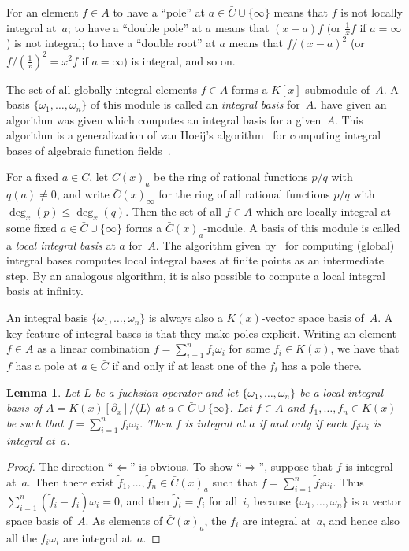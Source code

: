 \documentclass[final,1p,times,authoryear]{elsarticle}
\newtheorem{lemma}[theorem]{Lemma}
\def\<#1>{\langle#1\rangle}
\begin{document}
For an element $f\in A$ to have a ``pole'' at $a\in\bar C\cup\{\infty\}$ means
that $f$ is not locally integral at~$a$; to have a ``double pole'' at $a$ means
that $(x-a)f$ (or $\frac1xf$ if $a=\infty$) is not integral; to have a ``double
root'' at $a$ means that $f/(x-a)^2$ (or $f/(\frac1x)^2=x^2f$ if $a=\infty$) is integral,
and so on.

The set of all globally integral elements $f\in A$ forms a $K[x]$-submodule of~$A$.
A basis $\{\omega_1,\dots,\omega_n\}$ of this module is called an \emph{integral basis}
for~$A$. \cite{kauers15b} have given an algorithm was given which computes an integral basis
for a given~$A$. This algorithm is a generalization of van Hoeij's
algorithm~\citep{vanHoeij94} for computing integral bases of algebraic function
fields~\citep{trager84,Rybowicz:1991:ACI:120694.120715}.

For a fixed $a\in\bar C$, let $\bar C(x)_a$ be the ring of rational functions $p/q$
with $q(a)\neq0$, and write $\bar C(x)_\infty$ for the ring of all
rational functions $p/q$ with $\deg_x(p)\leq\deg_x(q)$.
Then the set of all $f\in A$ which are locally integral at some
fixed $a\in\bar C\cup\{\infty\}$ forms a $\bar C(x)_a$-module. A basis of this module is
called a \emph{local integral basis} at $a$ for~$A$. The algorithm given by~\cite{kauers15b}
for computing (global) integral bases computes local integral bases at finite
points as an intermediate step. By an analogous algorithm, it is also possible
to compute a local integral basis at infinity.

An integral basis $\{\omega_1,\dots,\omega_n\}$ is always also a $K(x)$-vector space
basis of~$A$. A key feature of integral bases is that they make poles explicit. Writing
an element $f\in A$ as a linear combination $f=\sum_{i=1}^n f_i\omega_i$ for some
$f_i\in K(x)$, we have that $f$ has a pole at $a\in\bar C$ if and only if at least one
of the $f_i$ has a pole there.

\begin{lemma}\label{lemma:1}
  Let $L$ be a fuchsian operator and let
  $\{\omega_1,\dots,\omega_n\}$ be a local integral basis of $A=K(x)[\partial_x]/\<L>$ at $a\in\bar C\cup\{\infty\}$.
  Let $f\in A$ and $f_1,\dots,f_n\in K(x)$ be such that $f=\sum_{i=1}^nf_i\omega_i$.
  Then $f$ is integral at $a$ if and only if each $f_i\omega_i$ is integral at~$a$.
\end{lemma}
\begin{proof}
  The direction ``$\Leftarrow$'' is obvious. To show ``$\Rightarrow$'', suppose
  that $f$ is integral at~$a$. Then there exist $\tilde{f}_1,\dots,\tilde{f}_n\in\bar C(x)_a$ such that
  $f=\sum_{i=1}^n\tilde{f}_i\omega_i$. Thus $\sum_{i=1}^n(\tilde{f}_i-f_i)\omega_i=0$, and then
  $\tilde{f}_i=f_i$ for all~$i$, because $\{\omega_1,\dots,\omega_n\}$ is a vector space basis of~$A$.
  As elements of $\bar C(x)_a$, the $f_i$ are integral at~$a$, and hence also all the $f_i\omega_i$
  are integral at~$a$.
\end{proof}
\end{document}
